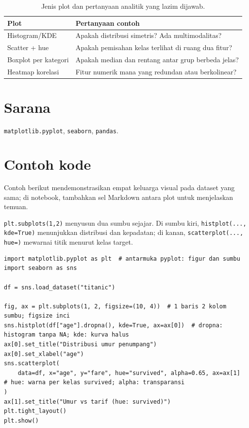 \documentclass[../main.tex]{subfiles}
\begin{document}
\begin{table}[htbp]
\centering
\caption{Jenis plot dan pertanyaan analitik yang lazim dijawab.}
\label{tab:plot-eda}
\begin{tabular}{@{}p{3.2cm}p{9.5cm}@{}}
\toprule
\textbf{Plot} & \textbf{Pertanyaan contoh} \\
\midrule
Histogram/KDE & Apakah distribusi simetris? Ada multimodalitas? \\
Scatter + hue & Apakah pemisahan kelas terlihat di ruang dua fitur? \\
Boxplot per kategori & Apakah median dan rentang antar grup berbeda jelas? \\
Heatmap korelasi & Fitur numerik mana yang redundan atau berkolinear? \\
\bottomrule
\end{tabular}
\end{table}

\section{Sarana}

\texttt{matplotlib.pyplot}, \texttt{seaborn}, \texttt{pandas}.

\section{Contoh kode}

Contoh berikut mendemonstrasikan empat keluarga visual pada dataset yang sama; di notebook, tambahkan sel Markdown antara plot untuk menjelaskan temuan.

\MulaiPenjelasanKode \texttt{plt.subplots(1,2)} menyusun dua sumbu sejajar. Di sumbu kiri, \texttt{histplot(..., kde=True)} menunjukkan distribusi dan kepadatan; di kanan, \texttt{scatterplot(..., hue=)} mewarnai titik menurut kelas target. \SelesaiPenjelasanKode

\begin{lstlisting}[caption=Histogram umur dan scatter umur vs fare]
import matplotlib.pyplot as plt  # antarmuka pyplot: figur dan sumbu
import seaborn as sns

df = sns.load_dataset("titanic")

fig, ax = plt.subplots(1, 2, figsize=(10, 4))  # 1 baris 2 kolom sumbu; figsize inci
sns.histplot(df["age"].dropna(), kde=True, ax=ax[0])  # dropna: histogram tanpa NA; kde: kurva halus
ax[0].set_title("Distribusi umur penumpang")
ax[0].set_xlabel("age")
sns.scatterplot(
    data=df, x="age", y="fare", hue="survived", alpha=0.65, ax=ax[1]  # hue: warna per kelas survived; alpha: transparansi
)
ax[1].set_title("Umur vs tarif (hue: survived)")
plt.tight_layout()
plt.show()
\end{lstlisting}
\end{document}
